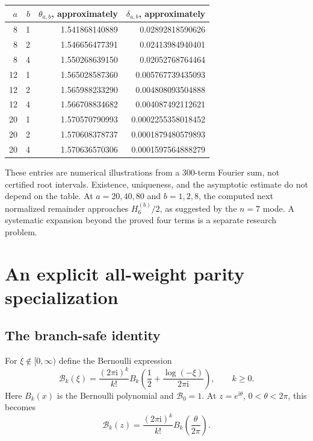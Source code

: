 \documentclass[11pt,a4paper]{article}
\numberwithin{equation}{section}
\theoremstyle{definition}
\theoremstyle{remark}
\newcommand{\ii}{\mathrm{i}}
\newcommand{\BB}{\mathcal B}
\begin{document}
\begin{center}
\small
\begin{tabular}{@{}rrrr@{}}
\toprule
$a$ & $b$ & $\theta_{a,b}$, approximately & $\delta_{a,b}$, approximately\\
\midrule
8&1&1.541868140889&0.02892818590626\\
8&2&1.546656477391&0.02413984940401\\
8&4&1.550268639150&0.02052768764464\\
12&1&1.565028587360&0.005767739435093\\
12&2&1.565988233290&0.004808093504888\\
12&4&1.566708834682&0.004087492112621\\
20&1&1.570570790993&0.0002255358018452\\
20&2&1.570608378737&0.0001879480579893\\
20&4&1.570636570306&0.0001597564888279\\
\bottomrule
\end{tabular}
\end{center}
These entries are numerical illustrations from a 300-term Fourier sum, not certified root intervals. Existence, uniqueness, and the asymptotic estimate do not depend on the table. At $a=20,40,80$ and $b=1,2,8$, the computed next normalized remainder approaches $H_6^{(b)}/2$, as suggested by the $n=7$ mode. A systematic expansion beyond the proved four terms is a separate research problem.

\section{An explicit all-weight parity specialization}
\label{sec:parity}

\subsection{The branch-safe identity}
For $\xi\notin[0,\infty)$ define the Bernoulli expression
\begin{equation}\label{eq:Bernoulli-def}
 \BB_k(\xi)=\frac{(2\pi\ii)^k}{k!}
 B_k\!\left(\frac12+\frac{\log(-\xi)}{2\pi\ii}\right),\qquad k\ge0.
\end{equation}
Here $B_k(x)$ is the Bernoulli polynomial and $\BB_0=1$. At $z=e^{\ii\theta}$, $0<\theta<2\pi$, this becomes
\begin{equation}\label{eq:Bernoulli-circle}
 \BB_k(z)=\frac{(2\pi\ii)^k}{k!}B_k\!\left(\frac{\theta}{2\pi}\right).
\end{equation}
\end{document}
